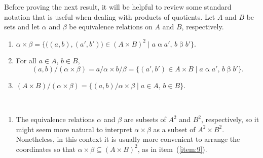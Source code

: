 Before proving the next result, it will be helpful to review some standard
notation that is useful when dealing with products of quotients.  
Let $A$ and $B$ be sets and let $\alpha$ and $\beta$ be equivalence relations on
$A$ and $B$, respectively.
\begin{enumerate}[(1)]
\item \label{item:9}
  $\alpha \times \beta = \{\bigl((a, b), (a', b')\bigr) 
  \in (A\times B)^2 \mid a\mathrel{\alpha} a', \, b\mathrel{\beta} b'\}$.
  \smallskip
\item \label{item:10}
  For all $a\in A$, $b\in B$, 
  \[(a,b)/(\alpha \times \beta) = a/\alpha \times b/\beta= 
    \{(a', b') \in A\times B \mid a\mathrel{\alpha} a', \, b\mathrel{\beta} b'\}.
  \]
\item \label{item:11}
  $(A\times B)/(\alpha \times \beta) = \{(a, b)/\alpha \times \beta \mid a\in A,\,b \in B\}$.
\end{enumerate}
\begin{remarks}\
  \begin{enumerate}
  \item The equivalence relations $\alpha$ and $\beta$ are subsets
    of $A^2$ and $B^2$, respectively, so it might seem more natural to interpret 
    $\alpha \times \beta$ as a subset of $A^2 \times B^2$. Nonetheless, in this 
    context it is usually more convenient to arrange the coordinates 
    so that $\alpha \times \beta \subseteq (A \times B)^2$, as in
    item~(\ref{item:9}).
  \end{enumerate}
\end{remarks}
\newpage

